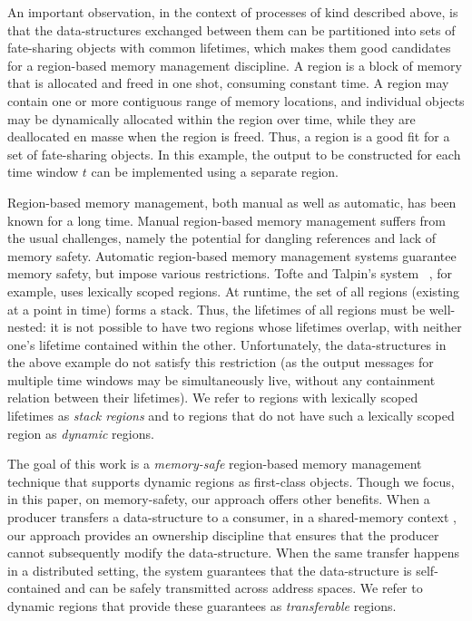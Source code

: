 
An important observation, in the context of processes of kind
described above, is that the data-structures exchanged between them
can be partitioned into sets of fate-sharing objects with common
lifetimes, which makes them good candidates for a region-based memory
management discipline. A region is a block of memory that is allocated
and freed in one shot, consuming constant time. A region may contain
one or more contiguous range of memory locations, and individual
objects may be dynamically allocated within the region over time,
while they are deallocated en masse when the region is freed.  Thus, a
region is a good fit for a set of fate-sharing objects.
In this example, the output to be constructed for each time window $t$
can be implemented using a separate region.

Region-based memory management, both manual as well as automatic, has
been known for a long time. Manual region-based memory management
suffers from the usual challenges, namely the potential for dangling
references and lack of memory safety. Automatic region-based memory
management systems guarantee memory safety, but impose various
restrictions.  Tofte and Talpin's system~\cite{tofte94,tofte97} , for
example, uses lexically scoped regions.  At runtime, the set of all
regions (existing at a point in time) forms a stack. Thus, the
lifetimes of all regions must be well-nested: it is not possible to
have two regions whose lifetimes overlap, with neither one's lifetime
contained within the other.  Unfortunately, the data-structures in the
above example do not satisfy this restriction (as the output messages
for multiple time windows may be simultaneously live, without any
containment relation between their lifetimes).  We refer to regions
with lexically scoped lifetimes as \emph{stack regions} and to regions
that do not have such a lexically scoped region as \emph{dynamic}
regions.

The goal of this work is a \emph{memory-safe} region-based memory
management technique that supports dynamic regions as first-class
objects. Though we focus, in this paper, on memory-safety, our
approach offers other benefits.  When a producer transfers a
data-structure to a consumer, in a shared-memory context , our
approach provides an ownership discipline that ensures that the
producer cannot subsequently modify the data-structure. When the same
transfer happens in a distributed setting, the system guarantees that
the data-structure is self-contained and can be safely transmitted
across address spaces.  We refer to dynamic regions that provide these
guarantees as \emph{transferable} regions.

